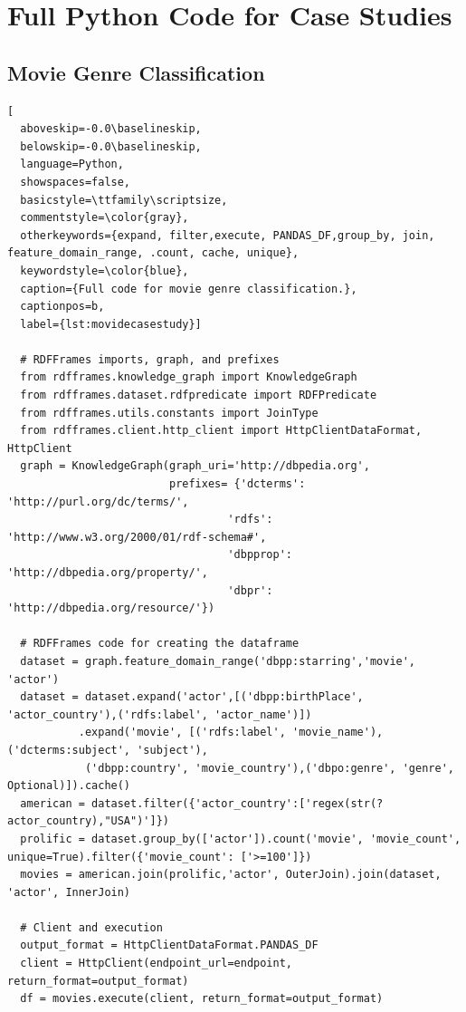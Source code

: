 \section{Full Python Code for Case Studies}
\label{app:fullcode}
\subsection{Movie Genre Classification}
\label{app:moviecase}

\begin{lstlisting}[
  aboveskip=-0.0\baselineskip,
  belowskip=-0.0\baselineskip,
  language=Python,
  showspaces=false,
  basicstyle=\ttfamily\scriptsize,
  commentstyle=\color{gray}, 
  otherkeywords={expand, filter,execute, PANDAS_DF,group_by, join, feature_domain_range, .count, cache, unique},
  keywordstyle=\color{blue},
  caption={Full code for movie genre classification.},
  captionpos=b,
  label={lst:movidecasestudy}]

  # RDFFrames imports, graph, and prefixes
  from rdfframes.knowledge_graph import KnowledgeGraph
  from rdfframes.dataset.rdfpredicate import RDFPredicate
  from rdfframes.utils.constants import JoinType
  from rdfframes.client.http_client import HttpClientDataFormat, HttpClient
  graph = KnowledgeGraph(graph_uri='http://dbpedia.org',
                         prefixes= {'dcterms': 'http://purl.org/dc/terms/',
                                  'rdfs': 'http://www.w3.org/2000/01/rdf-schema#',
                                  'dbpprop': 'http://dbpedia.org/property/',
                                  'dbpr': 'http://dbpedia.org/resource/'}) 
  
  # RDFFrames code for creating the dataframe
  dataset = graph.feature_domain_range('dbpp:starring','movie', 'actor')
  dataset = dataset.expand('actor',[('dbpp:birthPlace', 'actor_country'),('rdfs:label', 'actor_name')])
           .expand('movie', [('rdfs:label', 'movie_name'),('dcterms:subject', 'subject'),
            ('dbpp:country', 'movie_country'),('dbpo:genre', 'genre', Optional)]).cache()
  american = dataset.filter({'actor_country':['regex(str(?actor_country),"USA")']})
  prolific = dataset.group_by(['actor']).count('movie', 'movie_count', unique=True).filter({'movie_count': ['>=100']})
  movies = american.join(prolific,'actor', OuterJoin).join(dataset, 'actor', InnerJoin)
  
  # Client and execution
  output_format = HttpClientDataFormat.PANDAS_DF
  client = HttpClient(endpoint_url=endpoint, return_format=output_format)
  df = movies.execute(client, return_format=output_format)


\end{lstlisting}
